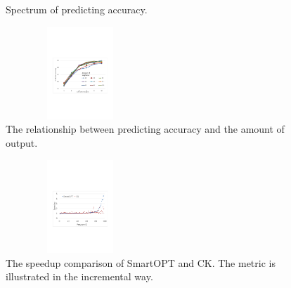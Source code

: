 \documentclass[bst/sn-mathphys]{sn-jnl}%
\theoremstyle{thmstyleone}%
\theoremstyle{thmstyletwo}%
\theoremstyle{thmstylethree}%
\begin{document}
\begin{figure}[h]%
\centering
{}
\caption{Spectrum of predicting accuracy.}\label{FIG7}
\end{figure}

\begin{figure}[h]%
\centering
\includegraphics[width=0.5\textwidth,height=3.5cm]{fig/fig8.pdf}
\caption{The relationship between predicting accuracy and the amount of 
output.}\label{FIG8}
\end{figure}


\begin{figure}[h]%
\centering
\includegraphics[width=0.5\textwidth,height=3.5cm]{fig/fig10.pdf}
\caption{The speedup comparison of SmartOPT and CK. The metric is illustrated 
in the incremental way.}\label{FIG10}
\end{figure}
\end{document}
